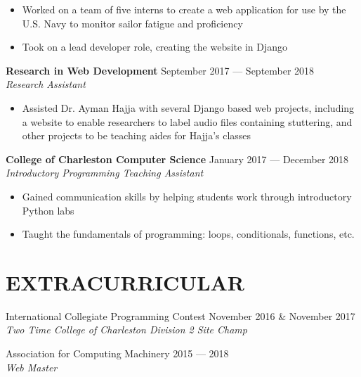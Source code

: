 \documentclass[letterpaper,14pt]{extarticle}
\begin{document}
  \begin{itemize}[itemsep=0pt, topsep=2pt]
    \item{Worked on a team of five interns to create a web application for use by the U.S. Navy to monitor sailor fatigue and proficiency}
    \item{Took on a lead developer role, creating the website in Django} \end{itemize}

  \textbf{Research in Web Development}
  \hspace*{\fill}
  \textcolor{color2}{September 2017 --- September 2018}
  \\ 
  \textcolor{color2}{
    \textit{
      \qquad{} Research Assistant
    }
  }

  \begin{itemize}[itemsep=0pt, topsep=2pt]
    \item{Assisted Dr. Ayman Hajja with several Django based web projects, including a website to enable researchers to label audio files containing stuttering, and other projects to be teaching aides for Hajja’s classes}
  \end{itemize}


  \textbf{College of Charleston Computer Science}
  \hspace*{\fill}
  \textcolor{color2}{January 2017 --- December 2018}
  \\ 
  \textcolor{color2}{
    \textit{
      \qquad{} Introductory Programming Teaching Assistant
    }
  }

  \begin{itemize}[itemsep=0pt, topsep=2pt]
    \item{Gained communication skills by helping students work through introductory Python labs}
    \item{Taught the fundamentals of programming: loops, conditionals, functions, etc.}
  \end{itemize}


\section*{EXTRACURRICULAR}
  {International Collegiate Programming Contest}
  \hspace*{\fill}
  \textcolor{color2}{November 2016 \& November 2017}
  \\ 
  \textcolor{color2}{
    \textit{
      \qquad{} Two Time College of Charleston Division 2 Site Champ
    }
  }

  \vspace*{4pt}

  {Association for Computing Machinery}
  \hspace*{\fill}
  \textcolor{color2}{2015 --- 2018}
  \\ 
  \textcolor{color2}{
    \textit{
      \qquad{} Web Master
    }
  }
\end{document}
